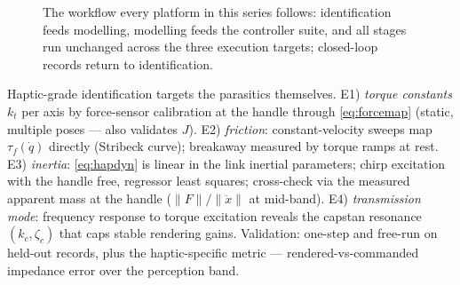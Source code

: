 \documentclass[conference]{IEEEtran}
\begin{document}
\begin{figure}[!t]
\centering
{}
\caption{The workflow every platform in this series follows: identification feeds modelling, modelling feeds the controller suite, and all stages run unchanged across the three execution targets; closed-loop records return to identification.}
\label{fig:workflow}
\end{figure}
Haptic-grade identification targets the parasitics themselves. E1) \emph{torque constants} $k_t$ per axis by force-sensor calibration at the handle through \eqref{eq:forcemap} (static, multiple poses --- also validates $J$). E2) \emph{friction}: constant-velocity sweeps map $\tau_f(\dot q)$ directly (Stribeck curve); breakaway measured by torque ramps at rest. E3) \emph{inertia}: \eqref{eq:hapdyn} is linear in the link inertial parameters; chirp excitation with the handle free, regressor least squares; cross-check via the measured apparent mass at the handle ($\|F\|/\|\ddot x\|$ at mid-band). E4) \emph{transmission mode}: frequency response to torque excitation reveals the capstan resonance $(k_c, \zeta_c)$ that caps stable rendering gains. Validation: one-step and free-run on held-out records, plus the haptic-specific metric --- rendered-vs-commanded impedance error over the perception band.

\end{document}
